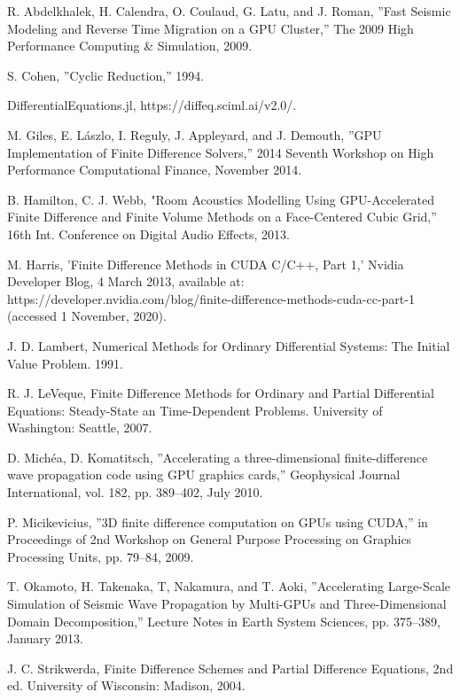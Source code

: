 \documentclass[conference]{IEEEtran}
\begin{document}
\begin{thebibliography}{12}

R. Abdelkhalek, H. Calendra, O. Coulaud, G. Latu, and J. Roman, ''Fast Seismic Modeling and Reverse Time Migration on a GPU Cluster,'' The 2009 High Performance Computing & Simulation, 2009.

S. Cohen, ''Cyclic Reduction,'' 1994.

DifferentialEquations.jl, https://diffeq.sciml.ai/v2.0/.

M. Giles, E. Lászlo, I. Reguly, J. Appleyard, and J. Demouth, ''GPU Implementation of Finite Difference Solvers,'' 2014 Seventh Workshop on High Performance Computational Finance, November 2014.

B. Hamilton, C. J. Webb, "Room Acoustics Modelling Using GPU-Accelerated Finite Difference and Finite Volume Methods on a Face-Centered Cubic Grid,'' 16th Int. Conference on Digital Audio Effects, 2013.

M. Harris, 'Finite Difference Methods in CUDA C/C++, Part 1,' Nvidia Developer Blog, 4 March 2013, available at: https://developer.nvidia.com/blog/finite-difference-methods-cuda-cc-part-1 (accessed 1 November, 2020).

J. D. Lambert, Numerical Methods for Ordinary Differential Systems: The Initial Value Problem. 1991. 

R. J. LeVeque, Finite Difference Methods for Ordinary and Partial Differential Equations: Steady-State an Time-Dependent Problems. University of Washington: Seattle, 2007.

D. Michéa, D. Komatitsch, ''Accelerating a three-dimensional finite-difference wave propagation code using GPU graphics cards,'' Geophysical Journal International, vol. 182, pp. 389--402, July 2010.

P. Micikevicius, ''3D finite difference computation on GPUs using CUDA,'' in Proceedings of 2nd Workshop on General Purpose Processing on Graphics Processing Units, pp. 79--84, 2009.

T. Okamoto, H. Takenaka, T, Nakamura, and T. Aoki, ''Accelerating Large-Scale Simulation of Seismic Wave Propagation by Multi-GPUs and Three-Dimensional Domain Decomposition,'' Lecture Notes in Earth System Sciences, pp. 375--389, January 2013.

J. C. Strikwerda, Finite Difference Schemes and Partial Difference Equations, 2nd ed. University of Wisconsin: Madison, 2004.


\end{thebibliography}
\end{document}
